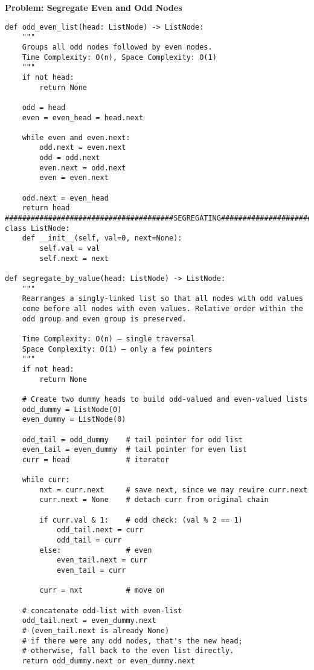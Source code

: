 \noindent\textbf{Problem: Segregate Even and Odd Nodes}
\begin{verbatim}
def odd_even_list(head: ListNode) -> ListNode:
    """
    Groups all odd nodes followed by even nodes.
    Time Complexity: O(n), Space Complexity: O(1)
    """
    if not head:
        return None
    
    odd = head
    even = even_head = head.next
    
    while even and even.next:
        odd.next = even.next
        odd = odd.next
        even.next = odd.next
        even = even.next
    
    odd.next = even_head
    return head
#######################################SEGREGATING################################
class ListNode:
    def __init__(self, val=0, next=None):
        self.val = val
        self.next = next

def segregate_by_value(head: ListNode) -> ListNode:
    """
    Rearranges a singly-linked list so that all nodes with odd values
    come before all nodes with even values. Relative order within the
    odd group and even group is preserved.

    Time Complexity: O(n) — single traversal
    Space Complexity: O(1) — only a few pointers
    """
    if not head:
        return None

    # Create two dummy heads to build odd-valued and even-valued lists
    odd_dummy = ListNode(0)
    even_dummy = ListNode(0)

    odd_tail = odd_dummy    # tail pointer for odd list
    even_tail = even_dummy  # tail pointer for even list
    curr = head             # iterator

    while curr:
        nxt = curr.next     # save next, since we may rewire curr.next
        curr.next = None    # detach curr from original chain

        if curr.val & 1:    # odd check: (val % 2 == 1)
            odd_tail.next = curr
            odd_tail = curr
        else:               # even
            even_tail.next = curr
            even_tail = curr

        curr = nxt          # move on

    # concatenate odd-list with even-list
    odd_tail.next = even_dummy.next
    # (even_tail.next is already None)
    # if there were any odd nodes, that's the new head;
    # otherwise, fall back to the even list directly.
    return odd_dummy.next or even_dummy.next

    
\end{verbatim}

